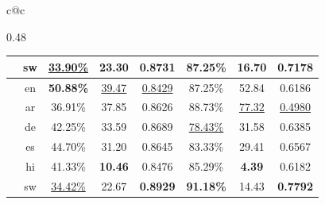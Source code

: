 \begin{table}[t!]
\begin{tabular}{c@{\hspace{1em}}c}
\begin{subtable}[c]{0.48\textwidth}
{\begin{tabular}{ccccc|ccc}
          & \cellcolor[HTML]{DDF6D2}\textsf{sw} & \cellcolor[HTML]{DDF6D2}\underline{33.90\%} & \cellcolor[HTML]{DDF6D2}23.30 & \cellcolor[HTML]{DDF6D2}\textbf{0.8731} & \cellcolor[HTML]{DDF6D2}87.25\% & \cellcolor[HTML]{DDF6D2}16.70 & \cellcolor[HTML]{DDF6D2}\textbf{0.7178}\\



            \midrule

          \multirow{6}{*}{\rotatebox[origin=c]{90}{\scriptsize{\lm{Llama3.3-70B}}}}
          & \cellcolor[HTML]{d8d8d8}\textsf{en} & \cellcolor[HTML]{d8d8d8}\textbf{50.88\%} & \cellcolor[HTML]{d8d8d8}\underline{39.47} & \cellcolor[HTML]{d8d8d8}\underline{0.8429}& \cellcolor[HTML]{d8d8d8}87.25\% & \cellcolor[HTML]{d8d8d8}52.84 & \cellcolor[HTML]{d8d8d8}0.6186\\

          & \cellcolor[HTML]{E5CCFF}\textsf{ar} & \cellcolor[HTML]{E5CCFF}36.91\% & \cellcolor[HTML]{E5CCFF}37.85 & \cellcolor[HTML]{E5CCFF}0.8626& \cellcolor[HTML]{E5CCFF}88.73\% & \cellcolor[HTML]{E5CCFF}\underline{77.32} & \cellcolor[HTML]{E5CCFF}\underline{0.4980}\\


          & \cellcolor[HTML]{E0E6FF}\textsf{de} & \cellcolor[HTML]{E0E6FF}42.25\% & \cellcolor[HTML]{E0E6FF}33.59 & \cellcolor[HTML]{E0E6FF}0.8689& \cellcolor[HTML]{E0E6FF}\underline{78.43\%} & \cellcolor[HTML]{E0E6FF}31.58 & \cellcolor[HTML]{E0E6FF}0.6385\\


          & \cellcolor[HTML]{FFF1D5}\textsf{es} &  \cellcolor[HTML]{FFF1D5}44.70\% &  \cellcolor[HTML]{FFF1D5}31.20 &  \cellcolor[HTML]{FFF1D5}0.8645&  \cellcolor[HTML]{FFF1D5}83.33\% &  \cellcolor[HTML]{FFF1D5}29.41 &  \cellcolor[HTML]{FFF1D5}0.6567\\


          & \cellcolor[HTML]{F2CFC2}\textsf{hi} & \cellcolor[HTML]{F2CFC2}41.33\% & \cellcolor[HTML]{F2CFC2}\textbf{10.46} & \cellcolor[HTML]{F2CFC2}0.8476& \cellcolor[HTML]{F2CFC2}85.29\% & \cellcolor[HTML]{F2CFC2}\textbf{4.39} & \cellcolor[HTML]{F2CFC2}0.6182\\

          & \cellcolor[HTML]{DDF6D2}\textsf{sw} & \cellcolor[HTML]{DDF6D2}\underline{34.42\%} & \cellcolor[HTML]{DDF6D2}22.67 & \cellcolor[HTML]{DDF6D2}\textbf{0.8929}& \cellcolor[HTML]{DDF6D2}\textbf{91.18\%} & \cellcolor[HTML]{DDF6D2}14.43 & \cellcolor[HTML]{DDF6D2}\textbf{0.7792}\\



\end{tabular}}
\end{subtable}
\end{tabular}
\end{table}
